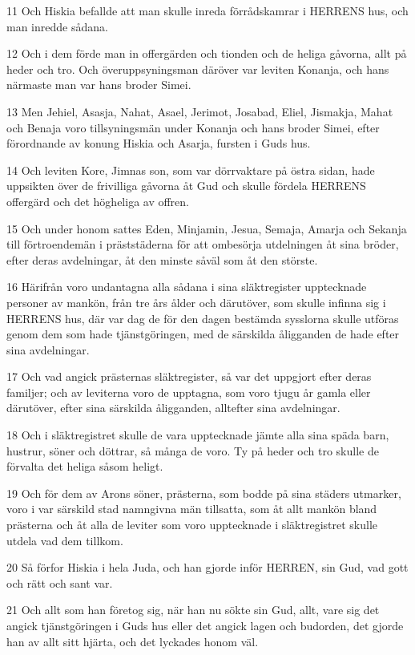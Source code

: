 \par 11 Och Hiskia befallde att man skulle inreda förrådskamrar i HERRENS hus, och man inredde sådana.
\par 12 Och i dem förde man in offergärden och tionden och de heliga gåvorna, allt på heder och tro. Och överuppsyningsman däröver var leviten Konanja, och hans närmaste man var hans broder Simei.
\par 13 Men Jehiel, Asasja, Nahat, Asael, Jerimot, Josabad, Eliel, Jismakja, Mahat och Benaja voro tillsyningsmän under Konanja och hans broder Simei, efter förordnande av konung Hiskia och Asarja, fursten i Guds hus.
\par 14 Och leviten Kore, Jimnas son, som var dörrvaktare på östra sidan, hade uppsikten över de frivilliga gåvorna åt Gud och skulle fördela HERRENS offergärd och det högheliga av offren.
\par 15 Och under honom sattes Eden, Minjamin, Jesua, Semaja, Amarja och Sekanja till förtroendemän i präststäderna för att ombesörja utdelningen åt sina bröder, efter deras avdelningar, åt den minste såväl som åt den störste.
\par 16 Härifrån voro undantagna alla sådana i sina släktregister upptecknade personer av mankön, från tre års ålder och därutöver, som skulle infinna sig i HERRENS hus, där var dag de för den dagen bestämda sysslorna skulle utföras genom dem som hade tjänstgöringen, med de särskilda åligganden de hade efter sina avdelningar.
\par 17 Och vad angick prästernas släktregister, så var det uppgjort efter deras familjer; och av leviterna voro de upptagna, som voro tjugu år gamla eller därutöver, efter sina särskilda åligganden, alltefter sina avdelningar.
\par 18 Och i släktregistret skulle de vara upptecknade jämte alla sina späda barn, hustrur, söner och döttrar, så många de voro. Ty på heder och tro skulle de förvalta det heliga såsom heligt.
\par 19 Och för dem av Arons söner, prästerna, som bodde på sina städers utmarker, voro i var särskild stad namngivna män tillsatta, som åt allt mankön bland prästerna och åt alla de leviter som voro upptecknade i släktregistret skulle utdela vad dem tillkom.
\par 20 Så förfor Hiskia i hela Juda, och han gjorde inför HERREN, sin Gud, vad gott och rätt och sant var.
\par 21 Och allt som han företog sig, när han nu sökte sin Gud, allt, vare sig det angick tjänstgöringen i Guds hus eller det angick lagen och budorden, det gjorde han av allt sitt hjärta, och det lyckades honom väl.


